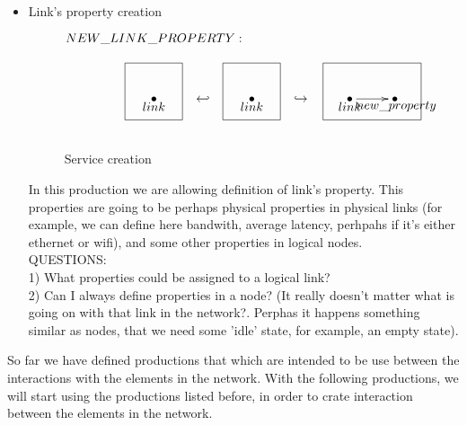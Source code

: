 \documentclass[envcountsect,runningheads]{llncs}
\begin{document}
\begin{itemize}
  \item Link's property creation
  \begin{figure}[H]
    \[
       \xymatrix@C=25pt@R=16pt
       {
         {}\POS[]+<0pc,2pc>\drop{NEW\_LINK\_PROPERTY:}
         \\
         {\bullet}\POS[]-<0pc,.5pc>\drop{link}
         \POS[]+<0pc,.5pc> *+=<3.8pc,3.8pc>[F-]{} 
         & {\hookleftarrow} &
         {\bullet}\POS[]-<0pc,.5pc>\drop{link}
         \POS[]+<0pc,.5pc> *+=<3.8pc,3.8pc>[F-]{} & {\hookrightarrow} &
         {\bullet}\ar@{->}[r]\POS[]-<0pc,.5pc>\drop{link}
         \POS[]+<1.5pc,.5pc> *+=<6.5pc,3.8pc>[F-]{} &
         {\bullet}
         \POS[]-<-.1pc,.5pc>*+=<4pc,4pc>[]{}\drop{new\_property}
       }
    \]
    \caption{Service creation}
    \protect\label{fig:servicecreation}
  \end{figure}
  In this production we are allowing definition of link's property. This properties are going to be 
  perhaps physical properties in physical links (for example, we can define here bandwith, 
  average latency, perhpahs if it's either ethernet or wifi), and some other properties in logical 
  nodes.\\
  QUESTIONS:\\
  1) What properties could be assigned to a logical link? \\
  2) Can I always define properties in a node? (It really doesn't matter what is going on with 
  that link in the network?. Perphas it happens something similar as nodes, that we need some 
  'idle' state, for example, an empty state).\\
  
  \end{itemize}
  
  So far we have defined productions that which are intended to be use between the interactions 
  with the elements in the network. With the following productions, we will start using the productions
  listed before, in order to crate interaction between the elements in the network. \\
  
\end{document}
